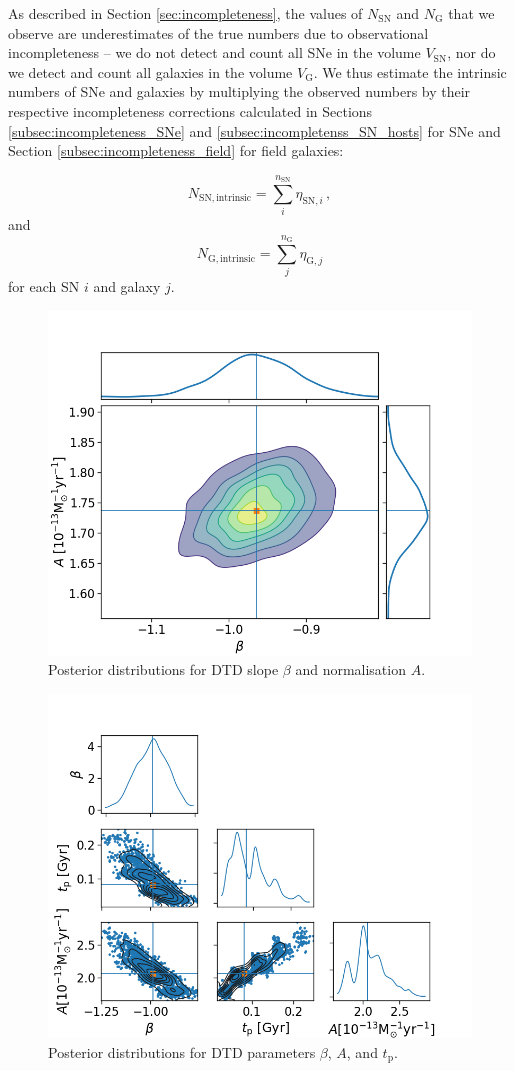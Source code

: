 \documentclass[fleqn,usenatbib]{mnras}
\begin{document}
As described in Section \ref{sec:incompleteness}, the values of $N_{\mathrm{SN}}$ and $N_{\mathrm{G}}$ that we observe are underestimates of the true numbers due to observational incompleteness -- we do not detect and count all SNe in the volume $V_{\mathrm{SN}}$, nor do we detect and count all galaxies in the volume $V_{\mathrm{G}}$. We thus estimate the intrinsic numbers of SNe and galaxies by multiplying the observed numbers by their respective incompleteness corrections calculated in Sections \ref{subsec:incompleteness_SNe} and \ref{subsec:incompletenss_SN_hosts} for SNe and Section \ref{subsec:incompleteness_field} for field galaxies:

\begin{equation}
    N_{\mathrm{SN,intrinsic}} = \sum_i^{n_{\mathrm{SN}}}\eta_{\mathrm{SN,}i}\,,
    \label{eq:corr_SN}
\end{equation}
and
\begin{equation}
    N_{\mathrm{G,intrinsic}} = \sum_j^{n_{\mathrm{G}}} \eta_{\mathrm{G,}j} 
    \label{eq:corr_G}
\end{equation}
for each SN $i$ and galaxy $j$.

\begin{figure}
    \centering
    \includegraphics[width=.5\textwidth]{figs/beta_A_Qerf1.1_corner.png}
    \caption{Posterior distributions for DTD slope $\beta$ and normalisation $A$. %
    \label{fig:corner_beta_norm}}
\end{figure}

\begin{figure}
    \centering
    \includegraphics[width=.5\textwidth]{figs/beta_A_tp_corner.png}
    \caption{Posterior distributions for DTD parameters $\beta$, $A$, and $t_{\mathrm{p}}$. %
    \label{fig:corner_beta_norm_tp}}
\end{figure}
\end{document}
